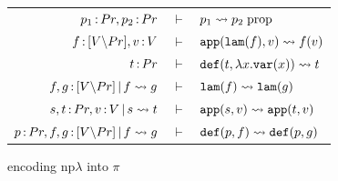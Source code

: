 \documentclass{article}
\begin{document}
\begin{mdframed}
\begin{center}
        \vspace{1em}

        \begin{tabular}{rcl}
             $p_1\,{:}\, Pr, p_2\,{:}\, Pr$ & $\vdash$ & $p_1\rightsquigarrow p_2\; \mathrm{prop}$\\
             $f\,{:}\, [V{\setminus} Pr], v\,{:}\, V$ & $\vdash$ & $\mathtt{app}(\mathtt{lam}(f), v)\rightsquigarrow f(v)$\\
             $t\,{:}\, Pr$ & $\vdash$ & $\mathtt{def}(t, \lambda x.\mathtt{var}(x))\rightsquigarrow t$ 
             \\
             $f, g\,{:}\, [V{\setminus} Pr]\,|\, f\rightsquigarrow g$ & $\vdash$ & $\mathtt{lam}(f)\rightsquigarrow \mathtt{lam}(g)$\\
             $s,t\,{:}\, Pr, v\,{:}\, V\,|\, s\rightsquigarrow t$ & $\vdash$ & $\mathtt{app}(s,v)\rightsquigarrow \mathtt{app}(t,v)$\\
             $p\,{:}\, Pr, f,g\,{:}\, [V{\setminus} Pr]\,|\, f\rightsquigarrow g$ & $\vdash$ & $\mathtt{def}(p,f)\rightsquigarrow \mathtt{def}(p,g)$
        \end{tabular}
    \end{center}
\end{mdframed}

encoding np$\lambda$ into $\pi$




\newpage
\end{document}
